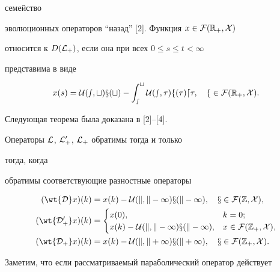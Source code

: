 семейство 


эволюционных операторов ``назад'' [2]. Функция $x\in\cal F(\Bbb R_+,X)$ 


относится к $D(\cal L_+)$, если она при всех $0\le s\le t<\infty$ 


представима в виде 


$$ 


x(s)=\cal U(s,t)x(t)-\int^t_s\cal U(s,\tau)f(\tau)d\tau,\quad 


f\in\cal F(\Bbb R_+,X). 


$$ 


 


Следующая теорема была доказана в [2]--[4]. 


 


\begin{thm} 


Операторы $\cal L$, $\cal L^0_+$, $\cal L_+$ обратимы тогда и только 


тогда, когда 


обратимы соответствующие разностные операторы 


\begin{align*} 


(\wt{\cal D}x)(k)&=x(k)-\cal U(k,k-1)x(k-1),\quad 


x\in\cal F(\Bbb Z,X),\\ 


%


(\wt{\cal D^0_+}x)(k)&= 


\begin{cases} 


x(0), & k=0;\\ 


x(k)-\cal U(k,k-1)x(k-1), & x\in\cal F(\Bbb Z_+,X), 


\end{cases} 


\\


(\wt {\cal D_+}x)(k)&=x(k)-\cal U(k,k+1)x(k+1),\quad 


x\in\cal F(\Bbb Z_+,X). 


\end{align*} 


\end{thm} 


 


Заметим, что если рассматриваемый параболический оператор действует 


